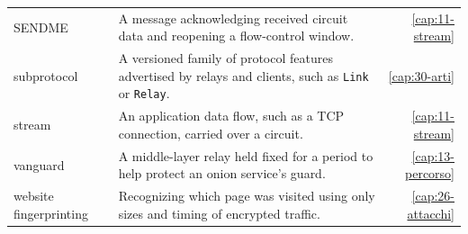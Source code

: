 {\begin{longtable}{@{}>{\raggedright\arraybackslash}p{4.1cm}>{\raggedright\arraybackslash}p{8.0cm}r@{}}
SENDME & A message acknowledging received circuit data and reopening a flow-control window. & \ref{cap:11-stream} \\
subprotocol & A versioned family of protocol features advertised by relays and clients, such as \texttt{Link} or \texttt{Relay}. & \ref{cap:30-arti} \\
stream & An application data flow, such as a TCP connection, carried over a circuit. & \ref{cap:11-stream} \\
vanguard & A middle-layer relay held fixed for a period to help protect an onion service's guard. & \ref{cap:13-percorso} \\
website fingerprinting & Recognizing which page was visited using only sizes and timing of encrypted traffic. & \ref{cap:26-attacchi} \\
\end{longtable}
}
